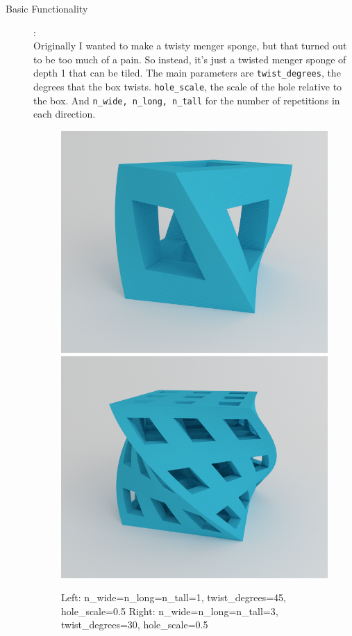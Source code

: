 \documentclass {article}
\begin{document}
	\newpage
	\begin{description}
		\item[Basic Functionality]:\\
		
		Originally I wanted to make a twisty menger sponge, but that turned out to be too much of a pain. So instead, it's just a twisted menger sponge of depth 1 that can be tiled. The main parameters are \texttt{twist\_degrees}, the degrees that the box twists. \texttt{hole\_scale}, the scale of the hole relative to the box. And \texttt{n\_wide, n\_long, n\_tall} for the number of repetitions in each direction.
		
		\begin{figure}[ht!]
			\includegraphics[width=.45\textwidth]{../model_single}\hfill
			\includegraphics[width=.45\textwidth]{../model}\hfill
			\caption{Left: n\_wide=n\_long=n\_tall=1, twist\_degrees=45, hole\_scale=0.5 Right: n\_wide=n\_long=n\_tall=3, twist\_degrees=30, hole\_scale=0.5 }
		\end{figure}
		
		
		
	\end{description}
	
\end{document}
